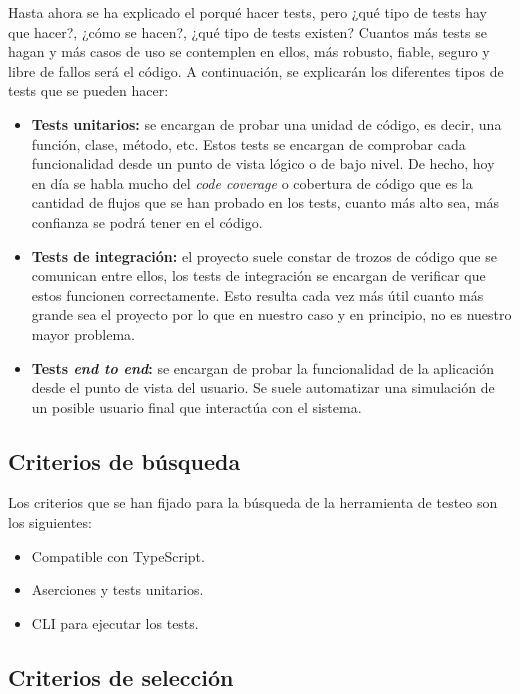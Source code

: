 Hasta ahora se ha explicado el porqué hacer tests, pero ¿qué tipo de tests hay que hacer?, ¿cómo se hacen?, ¿qué tipo de tests existen? Cuantos más tests se hagan y más casos de uso se contemplen en ellos, más robusto, fiable, seguro y libre de fallos será el código. A continuación, se explicarán los diferentes tipos de tests que se pueden hacer:

\begin{itemize}
    \item \textbf{Tests unitarios:} se encargan de probar una unidad de código, es decir, una función, clase, método, etc. Estos tests se encargan de comprobar cada funcionalidad desde un punto de vista lógico o de bajo nivel. De hecho, hoy en día se habla mucho del \textit{code coverage} o cobertura de código que es la cantidad de flujos que se han probado en los tests, cuanto más alto sea, más confianza se podrá tener en el código.
    \item \textbf{Tests de integración:} el proyecto suele constar de trozos de código que se comunican entre ellos, los tests de integración se encargan de verificar que estos funcionen correctamente. Esto resulta cada vez más útil cuanto más grande sea el proyecto por lo que en nuestro caso y en principio, no es nuestro mayor problema.
    \item \textbf{Tests \textit{end to end}:} se encargan de probar la funcionalidad de la aplicación desde el punto de vista del usuario. Se suele automatizar una simulación de un posible usuario final que interactúa con el sistema.
\end{itemize}

\subsection{Criterios de búsqueda}

Los criterios que se han fijado para la búsqueda de la herramienta de testeo son los siguientes:

\begin{itemize}
    \item Compatible con TypeScript.
    \item Aserciones y tests unitarios.
    \item CLI para ejecutar los tests.
\end{itemize}

\subsection{Criterios de selección}

